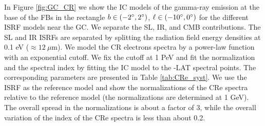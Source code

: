 In Figure \ref{fig:GC_CR} we show the IC models of the gamma-ray emission 
at the base of the FBs in the rectangle $b \in (-2^\circ, 2^\circ)$, $\ell \in (-10^\circ, 0^\circ)$
for the different ISRF models near the GC.
We separate the SL, IR, and CMB contributions.
The SL and IR ISRFs are separated by splitting the radiation field energy densities at 0.1 eV ($\approx 12\ \mu$m).
We model the CR electrons spectra by a power-law function with an exponential cutoff.
We fix the cutoff at 1 PeV and fit the normalization and the spectral index by fitting 
the IC model to the \Fermi-LAT spectral points.
The corresponding parameters are presented in Table \ref{tab:CRe_syst}.
We use the \cite{Porter:2008ve} ISRF as the reference model and show the normalizations of the CRe spectra
relative to the reference model (the normalizations are determined at 1 GeV).
The overall spread in the normalizations is about a factor of 3,
while the overall variation of the index of the CRe spectra is less than about 0.2.


